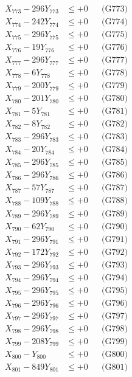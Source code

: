 \documentclass[a4paper,10pt]{article}
\begin{document}
{\begin{align}
X_{773} - 296Y_{773} &\leq +0 && \text{(G773)} \\
X_{774} - 242Y_{774} &\leq +0 && \text{(G774)} \\
X_{775} - 296Y_{775} &\leq +0 && \text{(G775)} \\
X_{776} - 19Y_{776} &\leq +0 && \text{(G776)} \\
X_{777} - 296Y_{777} &\leq +0 && \text{(G777)} \\
X_{778} - 6Y_{778} &\leq +0 && \text{(G778)} \\
X_{779} - 200Y_{779} &\leq +0 && \text{(G779)} \\
X_{780} - 201Y_{780} &\leq +0 && \text{(G780)} \\
\allowbreak
X_{781} - 5Y_{781} &\leq +0 && \text{(G781)} \\
X_{782} - 8Y_{782} &\leq +0 && \text{(G782)} \\
X_{783} - 296Y_{783} &\leq +0 && \text{(G783)} \\
X_{784} - 20Y_{784} &\leq +0 && \text{(G784)} \\
X_{785} - 296Y_{785} &\leq +0 && \text{(G785)} \\
X_{786} - 296Y_{786} &\leq +0 && \text{(G786)} \\
X_{787} - 57Y_{787} &\leq +0 && \text{(G787)} \\
X_{788} - 109Y_{788} &\leq +0 && \text{(G788)} \\
X_{789} - 296Y_{789} &\leq +0 && \text{(G789)} \\
X_{790} - 62Y_{790} &\leq +0 && \text{(G790)} \\
\allowbreak
X_{791} - 296Y_{791} &\leq +0 && \text{(G791)} \\
X_{792} - 172Y_{792} &\leq +0 && \text{(G792)} \\
X_{793} - 296Y_{793} &\leq +0 && \text{(G793)} \\
X_{794} - 296Y_{794} &\leq +0 && \text{(G794)} \\
X_{795} - 296Y_{795} &\leq +0 && \text{(G795)} \\
X_{796} - 296Y_{796} &\leq +0 && \text{(G796)} \\
X_{797} - 296Y_{797} &\leq +0 && \text{(G797)} \\
X_{798} - 296Y_{798} &\leq +0 && \text{(G798)} \\
X_{799} - 208Y_{799} &\leq +0 && \text{(G799)} \\
X_{800} - Y_{800} &\leq +0 && \text{(G800)} \\
\allowbreak
X_{801} - 849Y_{801} &\leq +0 && \text{(G801)} \\

\end{align}}
\end{document}
